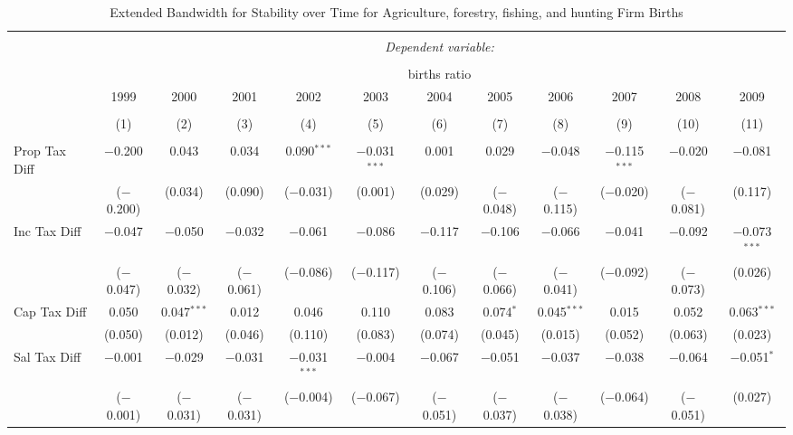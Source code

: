 
\begin{table}[!htbp] \centering 
  \caption{Extended Bandwidth for Stability over Time for  Agriculture, forestry, fishing, and hunting Firm Births} 
  \label{11year} 
\small 
\begin{tabular}{@{\extracolsep{5pt}}lccccccccccc} 
\\[-1.8ex]\hline 
\hline \\[-1.8ex] 
 & \multicolumn{11}{c}{\textit{Dependent variable:}} \\ 
\cline{2-12} 
\\[-1.8ex] & \multicolumn{11}{c}{births ratio} \\ 
 & 1999 & 2000 & 2001 & 2002 & 2003 & 2004 & 2005 & 2006 & 2007 & 2008 & 2009 \\ 
\\[-1.8ex] & (1) & (2) & (3) & (4) & (5) & (6) & (7) & (8) & (9) & (10) & (11)\\ 
\hline \\[-1.8ex] 
 Prop Tax Diff & $-$0.200 & 0.043 & 0.034 & 0.090$^{***}$ & $-$0.031$^{***}$ & 0.001 & 0.029 & $-$0.048 & $-$0.115$^{***}$ & $-$0.020 & $-$0.081 \\ 
  & ($-$0.200) & (0.034) & (0.090) & ($-$0.031) & (0.001) & (0.029) & ($-$0.048) & ($-$0.115) & ($-$0.020) & ($-$0.081) & (0.117) \\ 
  Inc Tax Diff & $-$0.047 & $-$0.050 & $-$0.032 & $-$0.061 & $-$0.086 & $-$0.117 & $-$0.106 & $-$0.066 & $-$0.041 & $-$0.092 & $-$0.073$^{***}$ \\ 
  & ($-$0.047) & ($-$0.032) & ($-$0.061) & ($-$0.086) & ($-$0.117) & ($-$0.106) & ($-$0.066) & ($-$0.041) & ($-$0.092) & ($-$0.073) & (0.026) \\ 
  Cap Tax Diff & 0.050 & 0.047$^{***}$ & 0.012 & 0.046 & 0.110 & 0.083 & 0.074$^{*}$ & 0.045$^{***}$ & 0.015 & 0.052 & 0.063$^{***}$ \\ 
  & (0.050) & (0.012) & (0.046) & (0.110) & (0.083) & (0.074) & (0.045) & (0.015) & (0.052) & (0.063) & (0.023) \\ 
  Sal Tax Diff & $-$0.001 & $-$0.029 & $-$0.031 & $-$0.031$^{***}$ & $-$0.004 & $-$0.067 & $-$0.051 & $-$0.037 & $-$0.038 & $-$0.064 & $-$0.051$^{*}$ \\ 
  & ($-$0.001) & ($-$0.031) & ($-$0.031) & ($-$0.004) & ($-$0.067) & ($-$0.051) & ($-$0.037) & ($-$0.038) & ($-$0.064) & ($-$0.051) & (0.027) \\ 

\end{tabular}
\end{table}

